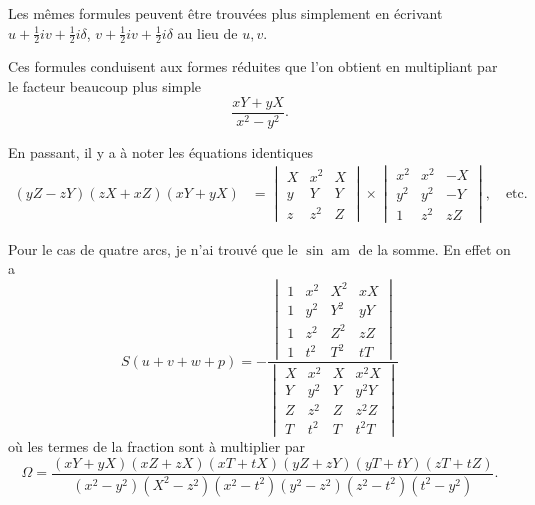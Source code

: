 \documentclass[11pt,a4paper]{book}
\begin{document}
Les m\^{e}mes formules peuvent \^{e}tre trouv\'{e}es plus simplement en \'{e}crivant $u + \frac{1}{2}iv + \frac{1}{2}i\delta$, $v + \frac{1}{2}iv + \frac{1}{2}i\delta$ au lieu de $u, v$.

Ces formules conduisent aux formes r\'{e}duites que l'on obtient en multipliant par le facteur beaucoup plus simple
\[
\frac{xY + yX}{x^2 - y^2}.
\]

En passant, il y a \`{a} noter les \'{e}quations identiques
\begin{align*}
(yZ - zY)(zX + xZ)(xY + yX) &=
\begin{vmatrix}
X & x^2 & X \\
y & Y & Y \\
z & z^2 & Z
\end{vmatrix} \times
\begin{vmatrix}
x^2 & x^2 & -X \\
y^2 & y^2 & -Y \\
1 & z^2 & zZ
\end{vmatrix}, \quad \text{etc.}
\end{align*}

Pour le cas de quatre arcs, je n'ai trouv\'{e} que le $\sin \operatorname{am}$ de la somme. En effet on a
\[
S(u + v + w + p) = -\frac{
\begin{vmatrix}
1 & x^2 & X^2 & xX \\
1 & y^2 & Y^2 & yY \\
1 & z^2 & Z^2 & zZ \\
1 & t^2 & T^2 & tT
\end{vmatrix}}{
\begin{vmatrix}
X & x^2 & X & x^2X \\
Y & y^2 & Y & y^2Y \\
Z & z^2 & Z & z^2Z \\
T & t^2 & T & t^2T
\end{vmatrix}}
\]
o\`{u} les termes de la fraction sont \`{a} multiplier par
\[
\Omega = \frac{(xY + yX)(xZ + zX)(xT + tX)(yZ + zY)(yT + tY)(zT + tZ)}{(x^2 - y^2)(X^2 - z^2)(x^2 - t^2)(y^2 - z^2)(z^2 - t^2)(t^2 - y^2)}.
\]
\end{document}
